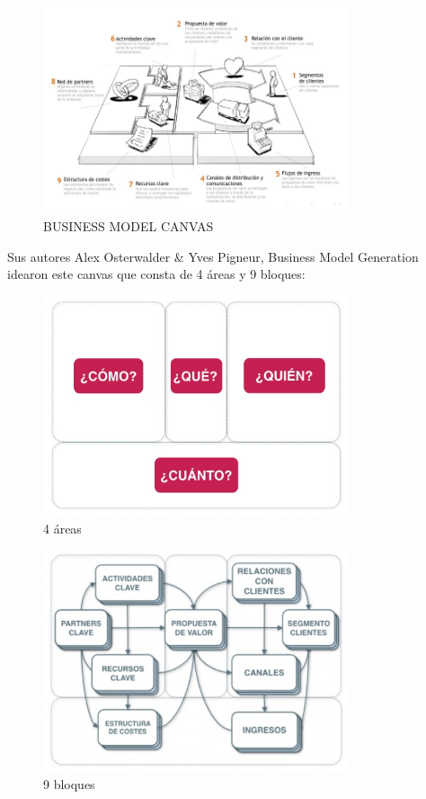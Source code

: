 \documentclass[a4paper,12pt,twocolumn]{article}
\begin{document}
\begin{figure}[h!]
\centering
\includegraphics[width=9cm]{./Imagenes/img14}
\caption{\label{fig:01}BUSINESS MODEL CANVAS}
\end{figure}

\item{Sus autores Alex Osterwalder & Yves Pigneur, Business Model Generation idearon este canvas que consta de 4 áreas y 9 bloques:}


\begin{figure}[h!]
\centering
\includegraphics[width=9cm]{./Imagenes/img15}
\caption{\label{fig:01}4 áreas}
\end{figure}

\begin{figure}[h!]
\centering
\includegraphics[width=9cm]{./Imagenes/img16}
\caption{\label{fig:01}9 bloques}
\end{figure}
\end{document}
